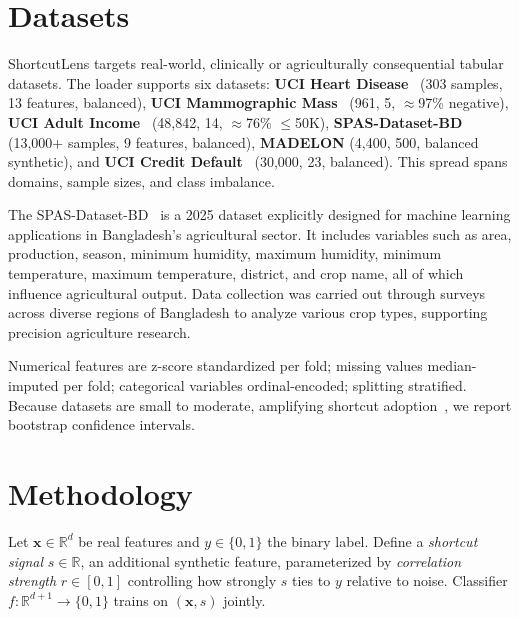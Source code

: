 \documentclass[conference]{IEEEtran}
\begin{document}

\section{Datasets}
\label{sec:datasets}

ShortcutLens targets real-world, clinically or agriculturally consequential tabular datasets. The loader supports six datasets: \textbf{UCI Heart Disease}~\cite{uci_heart} (303 samples, 13 features, balanced), \textbf{UCI Mammographic Mass}~\cite{uci_mammography} (961, 5, $\approx$97\% negative), \textbf{UCI Adult Income}~\cite{uci_adult} (48,842, 14, $\approx$76\% $\le$50K), \textbf{SPAS-Dataset-BD}~\cite{spas_dataset} (13,000+ samples, 9 features, balanced), \textbf{MADELON} (4,400, 500, balanced synthetic), and \textbf{UCI Credit Default}~\cite{uci_credit_default} (30,000, 23, balanced). This spread spans domains, sample sizes, and class imbalance.

The SPAS-Dataset-BD~\cite{spas_dataset} is a 2025 dataset explicitly designed for machine learning applications in Bangladesh's agricultural sector. It includes variables such as area, production, season, minimum humidity, maximum humidity, minimum temperature, maximum temperature, district, and crop name, all of which influence agricultural output. Data collection was carried out through surveys across diverse regions of Bangladesh to analyze various crop types, supporting precision agriculture research.

Numerical features are z-score standardized per fold; missing values median-imputed per fold; categorical variables ordinal-encoded; splitting stratified. Because datasets are small to moderate, amplifying shortcut adoption~\cite{sagawa2020dro}, we report bootstrap confidence intervals.


\section{Methodology}
\label{sec:methodology}

Let $\mathbf{x} \in \mathbb{R}^d$ be real features and $y \in \{0,1\}$ the binary label. Define a \textit{shortcut signal} $s \in \mathbb{R}$, an additional synthetic feature, parameterized by \textit{correlation strength} $r \in [0,1]$ controlling how strongly $s$ ties to $y$ relative to noise. Classifier $f: \mathbb{R}^{d+1} \rightarrow \{0,1\}$ trains on $(\mathbf{x}, s)$ jointly.
\end{document}

